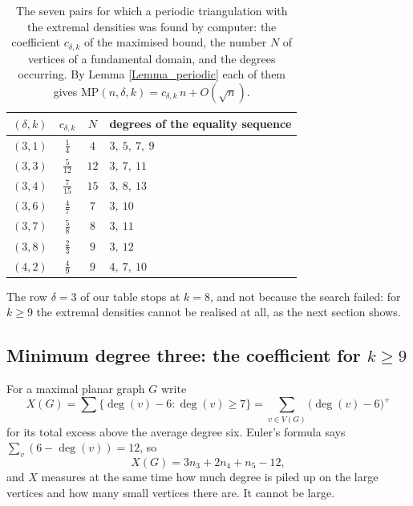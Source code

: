 \documentclass[12pt,a4paper]{article}%
\begin{document}
\begin{table}[htbp]
\begin{center}
\renewcommand{\arraystretch}{1.35}%
\begin{tabular}{|c|c|c|l|}
\hline
$(\delta ,k)$ & $c_{\delta ,k}$ & $N$ & degrees of the equality sequence\\[2pt] \hline
$(3,1)$ & $\tfrac{1}{4}$ & $4$ & $3,\ 5,\ 7,\ 9$\\
$(3,3)$ & $\tfrac{5}{12}$ & $12$ & $3,\ 7,\ 11$\\
$(3,4)$ & $\tfrac{7}{15}$ & $15$ & $3,\ 8,\ 13$\\
$(3,6)$ & $\tfrac{4}{7}$ & $7$ & $3,\ 10$\\
$(3,7)$ & $\tfrac{5}{8}$ & $8$ & $3,\ 11$\\
$(3,8)$ & $\tfrac{2}{3}$ & $9$ & $3,\ 12$\\
$(4,2)$ & $\tfrac{4}{9}$ & $9$ & $4,\ 7,\ 10$\\
\hline
\end{tabular}
\end{center}
\caption{The seven pairs for which a periodic triangulation with the extremal densities was found by computer:
the coefficient $c_{\delta ,k}$ of the maximised bound, the number $N$ of vertices of a fundamental domain, and
the degrees occurring. By Lemma \ref{Lemma_periodic} each of them gives
$\mathrm{MP}(n,\delta ,k)=c_{\delta ,k}\,n+O(\sqrt{n})$.}%
\label{Tab_computer}%
\end{table}

The row $\delta =3$ of our table stops at $k=8$, and not because the search failed: for $k\geq 9$ the extremal
densities cannot be realised at all, as the next section shows.

\subsection{Minimum degree three: the coefficient for $k\geq 9$}
\label{Sec_deg3exact}

For a maximal planar graph $G$ write
\[
X(G)=\sum \{\deg (v)-6:\deg (v)\geq 7\}=\sum_{v\in V(G)}\bigl(\deg (v)-6\bigr)^{+}
\]
for its total excess above the average degree six. Euler's formula says $\sum_{v}(6-\deg (v))=12$, so
\begin{equation}
X(G)=3n_{3}+2n_{4}+n_{5}-12,\label{eq_excess}
\end{equation}
and $X$ measures at the same time how much degree is piled up on the large vertices and how many small vertices
there are. It cannot be large.
\end{document}
